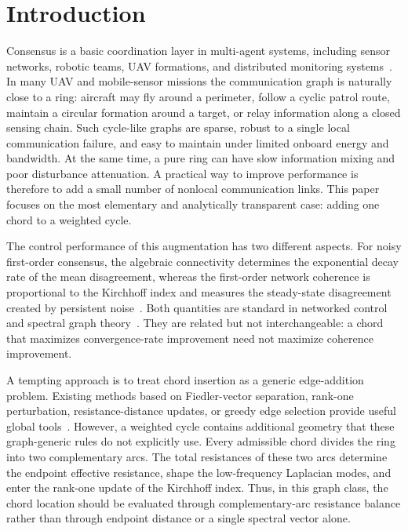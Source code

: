\documentclass[11pt]{article}
\numberwithin{equation}{section}
\theoremstyle{definition}
\theoremstyle{remark}
\begin{document}
\section{Introduction}
\label{sec:introduction}
Consensus is a basic coordination layer in multi-agent systems, including sensor networks, robotic teams, UAV formations, and distributed monitoring systems~\cite{BulloCortesMartinez2009,OlfatiSaberFaxMurray2007,RenBeard2005}. In many UAV and mobile-sensor missions the communication graph is naturally close to a ring: aircraft may fly around a perimeter, follow a cyclic patrol route, maintain a circular formation around a target, or relay information along a closed sensing chain. Such cycle-like graphs are sparse, robust to a single local communication failure, and easy to maintain under limited onboard energy and bandwidth. At the same time, a pure ring can have slow information mixing and poor disturbance attenuation. A practical way to improve performance is therefore to add a small number of nonlocal communication links. This paper focuses on the most elementary and analytically transparent case: adding one chord to a weighted cycle.

The control performance of this augmentation has two different aspects. For noisy first-order consensus, the algebraic connectivity determines the exponential decay rate of the mean disagreement, whereas the first-order network coherence is proportional to the Kirchhoff index and measures the steady-state disagreement created by persistent noise~\cite{Bamieh2012,Young2010}. Both quantities are standard in networked control and spectral graph theory~\cite{Fiedler1973,Klein1993,GutmanMohar1996}. They are related but not interchangeable: a chord that maximizes convergence-rate improvement need not maximize coherence improvement.

A tempting approach is to treat chord insertion as a generic edge-addition problem. Existing methods based on Fiedler-vector separation, rank-one perturbation, resistance-distance updates, or greedy edge selection provide useful global tools~\cite{Ghosh2006,Kim2010,Sardar2025,Sydney2013,WanEtAl2008}. However, a weighted cycle contains additional geometry that these graph-generic rules do not explicitly use. Every admissible chord divides the ring into two complementary arcs. The total resistances of these two arcs determine the endpoint effective resistance, shape the low-frequency Laplacian modes, and enter the rank-one update of the Kirchhoff index. Thus, in this graph class, the chord location should be evaluated through complementary-arc resistance balance rather than through endpoint distance or a single spectral vector alone.
\end{document}
